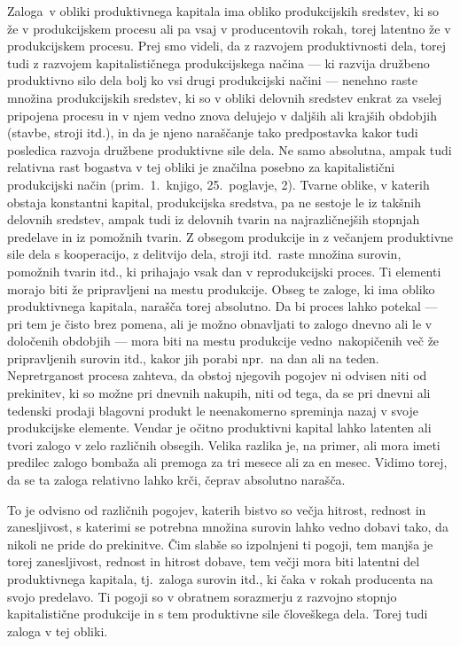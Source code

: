 \documentclass[kapital_02.tex]{subfiles}
\begin{document}
Zaloga\KPEstran\ v obliki produktivnega kapitala ima obliko produkcijskih sredstev, ki so že v produkcijskem procesu ali pa vsaj v producentovih rokah, torej latentno že v produkcijskem procesu.
Prej smo videli, da z razvojem produktivnosti dela, torej tudi z razvojem kapitalističnega produkcijskega načina — ki razvija družbeno produktivno silo dela bolj ko vsi drugi produkcijski načini — nenehno raste množina produkcijskih sredstev, ki so v obliki delovnih sredstev enkrat za vselej pripojena procesu in v njem vedno znova delujejo v daljših ali krajših obdobjih (stavbe, stroji itd.), in da je njeno naraščanje tako predpostavka kakor tudi posledica razvoja družbene produktivne sile dela.
Ne samo absolutna, ampak tudi relativna rast bogastva v tej obliki je značilna posebno za kapitalistični produkcijski način (prim.\ 1.\ knjigo, 25.\ poglavje, 2).
Tvarne oblike, v katerih obstaja konstantni kapital, produkcijska sredstva, pa ne sestoje le iz takšnih delovnih sredstev, ampak tudi iz delovnih tvarin na najrazličnejših stopnjah predelave in iz pomožnih tvarin.
Z obsegom produkcije in z večanjem produktivne sile dela s kooperacijo, z delitvijo dela, stroji itd.\ raste množina surovin, pomožnih tvarin itd., ki prihajajo vsak dan v reprodukcijski proces.
Ti elementi morajo biti že pripravljeni na mestu produkcije. Obseg te zaloge, ki ima obliko produktivnega kapitala, narašča torej absolutno.
Da bi proces lahko potekal — pri tem je čisto brez pomena, ali je možno obnavljati to zalogo dnevno ali le v določenih obdobjih — mora biti na mestu produkcije vedno\KPEstran\ nakopičenih več že pripravljenih surovin itd., kakor jih porabi npr.\ na dan ali na teden.
Nepretrganost procesa zahteva, da obstoj njegovih pogojev ni odvisen niti od prekinitev, ki so možne pri dnevnih nakupih, niti od tega, da se pri dnevni ali tedenski prodaji blagovni produkt le neenakomerno spreminja nazaj v svoje produkcijske elemente.
Vendar je očitno produktivni kapital lahko latenten ali tvori zalogo v zelo različnih obsegih.
Velika razlika je, na primer, ali mora imeti predilec zalogo bombaža ali premoga za tri mesece ali za en mesec.
Vidimo torej, da se ta zaloga relativno lahko krči, čeprav absolutno narašča.

To je odvisno od različnih pogojev, katerih bistvo so večja hitrost, rednost in zanesljivost, s katerimi se potrebna množina surovin lahko vedno dobavi tako, da nikoli ne pride do prekinitve.
Čim slabše so izpolnjeni ti pogoji, tem manjša je torej zanesljivost, rednost in hitrost dobave, tem večji mora biti latentni del produktivnega kapitala, tj.\ zaloga surovin itd., ki čaka v rokah producenta na svojo predelavo.
Ti pogoji so v obratnem sorazmerju z razvojno stopnjo kapitalistične produkcije in s tem produktivne sile človeškega dela.
Torej tudi zaloga v tej obliki.
\end{document}

